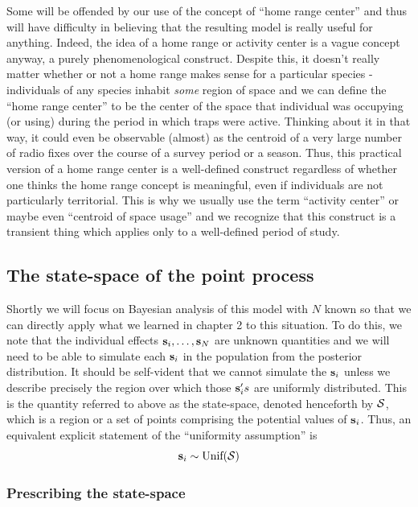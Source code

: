 Some will be offended by our use of the concept of ``home range
center'' and thus will have difficulty in believing that the resulting
model is really useful for anything.  Indeed, the idea of a home range
or activity center is a vague concept anyway, a purely
phenomenological construct.  Despite this, it doesn't really matter
whether or not a home range makes sense for a particular species -
individuals of any species inhabit {\it some} region of space and we
can define the ``home range center'' to be the center of the space
that individual was occupying (or using) during the period in which
traps were active. Thinking about it in that way, it could even be
observable (almost) as the centroid of a very large number of radio
fixes over the course of a survey period or a season.  Thus, this
practical version of a home range center is a well-defined construct
regardless of whether one thinks the home range concept is meaningful,
even if individuals are not particularly territorial.  This is why we
usually use the term ``activity center'' or maybe even ``centroid of
space usage'' and we recognize that this construct is a transient
thing which applies only to a well-defined period of
study. 



\subsection{The state-space of the point process}

Shortly we will focus on Bayesian analysis of this model with $N$
known so that we can directly apply what we learned in chapter 2 to
this situation. To do this, we note that the individual effects ${\bf
  s}_{i},\ldots, {\bf s}_{N}$ are unknown quantities and we will need
to be able to simulate each ${\bf s}_{i}$ in the population from the
posterior distribution.  It should be self-vident that we cannot
simulate the ${\bf s}_{i}$ unless we describe precisely the region
over which those ${\bf s}_{i}'s$ are uniformly distributed. This is
the quantity referred to above as the state-space, denoted henceforth
by ${\cal S}$, which is a region or a set of points comprising the
potential values of ${\bf s}_{i}$. Thus, an equivalent explicit
statement of the ``uniformity assumption'' is
\[
{\bf s}_{i} \sim \mbox{Unif}({\cal S})
\]


\subsubsection{Prescribing the state-space}

